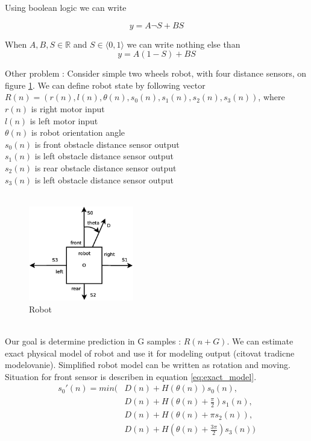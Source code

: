 \documentclass[10pt,a5paper]{article}
\begin{document}
Using boolean logic we can write

\begin{equation}
\label{eq:boolean mux}
  y = A\neg S + BS
\end{equation}

When $A, B, S \in \mathbb{R}$ and $S \in \langle 0, 1 \rangle$ we can write nothing else than
\begin{equation}
\label{eq:fuzzy mux}
  y = A(1-S) + BS
\end{equation}

Other problem :
Consider simple two wheels robot, with four distance sensors, on figure \ref{img:robot}.
We can define robot state by following vector $R(n) = (r(n), l(n), \theta(n), s_0(n), s_1(n), s_2(n), s_3(n))$,
where \\
$r(n)$ is right motor input \\
$l(n)$ is left motor input \\
$\theta(n)$ is robot orientation angle \\
$s_0(n)$ is front obstacle distance sensor output \\
$s_1(n)$ is left obstacle distance sensor output \\
$s_2(n)$ is rear obstacle distance sensor output \\
$s_3(n)$ is left obstacle distance sensor output \\
\\
\begin{figure}[!ht]
\centering
\includegraphics[width=1.8in]{images/robot.eps}
\caption{Robot}
\label{img:robot}
\end{figure}
\\
Our goal is determine prediction in G samples : $R(n+G)$. We can estimate exact physical model of robot and use it for modeling output (citovat tradicne modelovanie).
Simplified robot model can be written as rotation and moving.
 Situation for front sensor is describen in equation \ref{eq:exact_model}.
\\
\begin{align}
\label{eq:exact_model}
	s_0'(n) = min ( &D(n) + H(\theta(n))s_0(n) , \\
			&D(n) + H(\theta(n) + \frac{\pi}{2})s_1(n) , \nonumber \\
			&D(n) + H(\theta(n) + \pi s_2(n)) , \nonumber \\
			&D(n) + H(\theta(n) + \frac{3\pi}{2})s_3(n)) \nonumber
\end{align}
\end{document}
